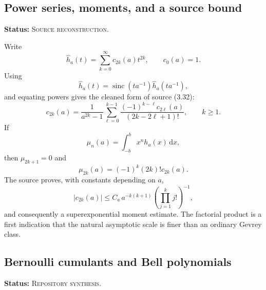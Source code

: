 \documentclass[11pt]{article}
\theoremstyle{definition}
\theoremstyle{remark}
\newcommand{\sinc}{\operatorname{sinc}}
\newcommand{\dd}{\,\mathrm{d}}
\newcommand{\SourceStatus}{\textcolor{SourceBlue}{\textsc{Source reconstruction}}}
\newcommand{\RepoStatus}{\textcolor{RepoOlive}{\textsc{Repository synthesis}}}
\newcommand{\status}[1]{\par\smallskip\noindent\textbf{Status:} #1.\par\smallskip}
\begin{document}
\subsection{Power series, moments, and a source bound}
\status{\SourceStatus}

Write
\begin{equation}
  \widehat h_a(t)=\sum_{k=0}^{\infty}c_{2k}(a)t^{2k},
  \qquad c_0(a)=1.
  \label{eq:ha-c-series}
\end{equation}
Using
\begin{equation}
  \widehat h_a(t)=\sinc(ta^{-1})\widehat h_a(ta^{-1}),
  \label{eq:ha-fourier-refinement}
\end{equation}
and equating powers gives the cleaned form of source (3.32):
\begin{equation}
  c_{2k}(a)=\frac1{a^{2k}-1}
  \sum_{\ell=0}^{k-1}
  \frac{(-1)^{k-\ell}c_{2\ell}(a)}{(2k-2\ell+1)!},
  \qquad k\ge1.
  \label{eq:c-recurrence}
\end{equation}
If
\begin{equation}
  \mu_n(a)=\int_{-b}^{b}x^n h_a(x)\dd x,
  \label{eq:moments-def}
\end{equation}
then \(\mu_{2k+1}=0\) and
\begin{equation}
  \mu_{2k}(a)=(-1)^k(2k)!c_{2k}(a).
  \label{eq:moment-c}
\end{equation}
The source proves, with constants depending on \(a\),
\begin{equation}
  |c_{2k}(a)|\le C_a\,a^{-k(k+1)}
     \left(\prod_{j=1}^{k}j!\right)^{-1},
  \label{eq:source-c-bound}
\end{equation}
and consequently a superexponential moment estimate.  The factorial product is a first indication that the natural asymptotic scale is finer than an ordinary Gevrey class.

\subsection{Bernoulli cumulants and Bell polynomials}
\status{\RepoStatus}
\end{document}
